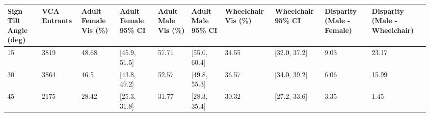 \begin{tabular}{llllllllll}
\hline
Sign Tilt Angle (deg) & VCA Entrants & Adult Female Vis (\%) & Adult Female 95\% CI & Adult Male Vis (\%) & Adult Male 95\% CI & Wheelchair Vis (\%) & Wheelchair 95\% CI & Disparity (Male - Female) & Disparity (Male - Wheelchair) \\ \hline
15 & 3819 & 48.68 & [45.9, 51.5] & 57.71 & [55.0, 60.4] & 34.55 & [32.0, 37.2] & 9.03 & 23.17 \\
30 & 3864 & 46.5 & [43.8, 49.2] & 52.57 & [49.8, 55.3] & 36.57 & [34.0, 39.2] & 6.06 & 15.99 \\
45 & 2175 & 28.42 & [25.3, 31.8] & 31.77 & [28.3, 35.4] & 30.32 & [27.2, 33.6] & 3.35 & 1.45 \\
\hline
\end{tabular}
